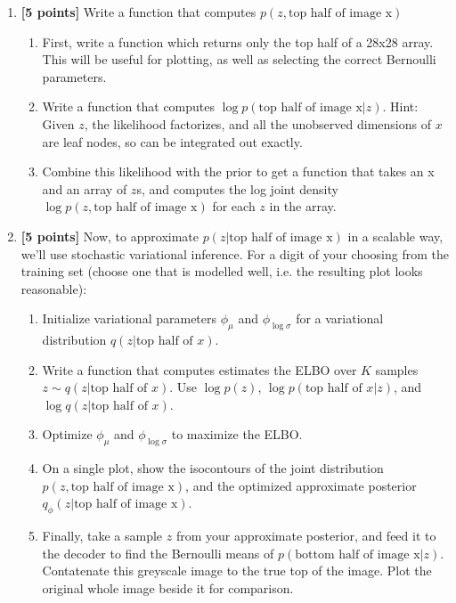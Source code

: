 \documentclass{article}
\begin{document}
\begin{enumerate}[label=(\alph*)]	
	\item {\bf [5 points]} Write a function that computes $p(z, \text{top half of image x})$
	
	\begin{enumerate}[label=(\alph*)]
		\item First, write a function which returns only the top half of a 28x28 array. This will be useful for plotting, as well as selecting the correct Bernoulli parameters.
    \item Write a function that computes $\log p(\text{top half of image x} | z)$. Hint: Given $z$, the likelihood factorizes, and all the unobserved dimensions of $x$ are leaf nodes, so can be integrated out exactly. 
		\item Combine this likelihood with the prior to get a function that takes an x and an array of $z$s, and computes the log joint density $\log p(z, \text{top half of image x})$ for each $z$ in the array.
	\end{enumerate}

	
	\item {\bf [5 points]} Now, to approximate $p(z | \text{top half of image x})$ in a scalable way, we'll use stochastic variational inference.  
    For a digit of your choosing from the training set (choose one that is modelled well, i.e. the resulting plot looks reasonable):

	\begin{enumerate}[label=(\alph*)]
		\item Initialize variational parameters $\phi_\mu$ and $\phi_{\log \sigma}$ for a variational distribution $q(z|\text{top half of $x$})$.
		\item Write a function that computes estimates the ELBO over $K$ samples $z \sim q(z|\text{top half of $x$})$.
		Use $\log p(z)$, $\log p(\text{top half of $x$} | z)$, and $\log q(z|\text{top half of $x$})$.
		\item Optimize $\phi_\mu$ and $\phi_{\log \sigma}$ to maximize the ELBO.
		\item On a single plot, show the isocontours of the joint distribution $p(z, \text{top half of image x})$, and the optimized approximate posterior $q_\phi(z | \text{top half of image x})$.
		\item Finally, take a sample $z$ from your approximate posterior, and feed it to the decoder to find the Bernoulli means of $p( \text{bottom half of image x}|z)$.  Contatenate this greyscale image to the true top of the image.
		Plot the original whole image beside it for comparison.
	\end{enumerate}


\end{enumerate}
\end{document}
